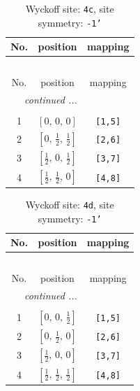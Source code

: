 \documentclass[fleqn,8pt]{jsarticle}
\begin{document}
\renewcommand{\arraystretch}{1.2}
\begin{longtable}{ccc}
\caption{Wyckoff site: {\tt 4c}, site symmetry: {\tt -1'}}
 \\
 \hline \hline
No. & position & mapping \\ \hline \endfirsthead

\multicolumn{2}{l}{\tablename\ \thetable{}} \\
 \hline \hline
No. & position & mapping \\ \hline \endhead

 \hline \hline
\multicolumn{2}{r}{\footnotesize\it continued ...} \\ \endfoot

 \hline \hline
\multicolumn{2}{r}{} \\ \endlastfoot

1 & $\left[ 0,\, 0,\, 0 \right]$ & {\tt [1,5]} \\ \hline
2 & $\left[ 0,\, \frac{1}{2},\, \frac{1}{2} \right]$ & {\tt [2,6]} \\ \hline
3 & $\left[ \frac{1}{2},\, 0,\, \frac{1}{2} \right]$ & {\tt [3,7]} \\ \hline
4 & $\left[ \frac{1}{2},\, \frac{1}{2},\, 0 \right]$ & {\tt [4,8]} \\
\end{longtable}
\renewcommand{\arraystretch}{1.2}
\begin{longtable}{ccc}
\caption{Wyckoff site: {\tt 4d}, site symmetry: {\tt -1'}}
 \\
 \hline \hline
No. & position & mapping \\ \hline \endfirsthead

\multicolumn{2}{l}{\tablename\ \thetable{}} \\
 \hline \hline
No. & position & mapping \\ \hline \endhead

 \hline \hline
\multicolumn{2}{r}{\footnotesize\it continued ...} \\ \endfoot

 \hline \hline
\multicolumn{2}{r}{} \\ \endlastfoot

1 & $\left[ 0,\, 0,\, \frac{1}{2} \right]$ & {\tt [1,5]} \\ \hline
2 & $\left[ 0,\, \frac{1}{2},\, 0 \right]$ & {\tt [2,6]} \\ \hline
3 & $\left[ \frac{1}{2},\, 0,\, 0 \right]$ & {\tt [3,7]} \\ \hline
4 & $\left[ \frac{1}{2},\, \frac{1}{2},\, \frac{1}{2} \right]$ & {\tt [4,8]} \\
\end{longtable}
\end{document}
